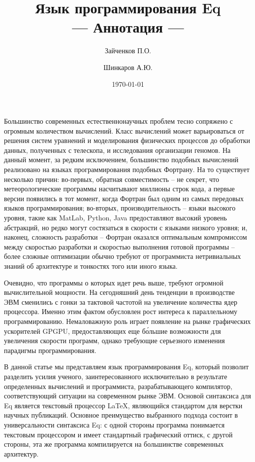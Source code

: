 \documentclass[a4paper]{llncs}
\author{Зайченков П.О.\inst{1} \and Шинкаров А.Ю.\inst{2}}
\date{\today}
\title{Язык программирования Eq \\
      --- Аннотация ---}
\institute{
  Московский физико-технический институт,
  Кафедра информатики и вычислительной техники
\and
  University of Hertfordshire,
  Hatfield, Hertfordshire,
  AL10 9AB, United Kingdom
}
\begin{document}
\maketitle

Большинство современных естественнонаучных проблем тесно сопряжено с
огромным количеством вычислений.  Класс вычислений может
варьироваться от решения систем уравнений и моделирования физических процессов 
до обработки данных, полученных с телескопа, и
исследования организации геномов.  На данный момент, за редким
исключением, большинство подобных вычислений реализовано на языках
программирования подобных Фортрану.  На то существует несколько
причин: во-первых, обратная совместимость -- не секрет, что
метеорологические программы насчитывают миллионы строк кода, а первые
версии появились в тот момент, когда Фортран был одним из самых
передовых языков программирования; во-вторых, производительность --
языки высокого уровня, такие как MatLab, Python, Java предоставляют
высокий уровень абстракций, но редко могут состязаться в скорости с
языками низкого уровня; и, наконец, сложность разработки -- Фортран
оказался оптимальным компромиссом между скоростью разработки и скоростью
выполнения готовой программы -- более сложные оптимизации обычно
требуют от программиста нетривиальных знаний об архитектуре и
тонкостях того или иного языка.

Очевидно, что программы о которых идет речь выше, требуют огромной
вычислительной мощности.  На сегодняшний день тенденции в
производстве ЭВМ сменились с гонки за тактовой частотой на
увеличение количества ядер процессора.  Именно этим фактом обусловлен рост
интереса к параллельному программированию.  Немаловажную роль
играет появление на рынке графических ускорителей GPGPU,
предоставляющих еще б\'{о}льшие возможности для увеличения скорости
программ, однако требующие серьезного изменения парадигмы
программирования.

В данной статье мы представляем язык программирования Eq, который
позволит разделить усилия ученого, заинтересованного исключительно в
результате определенных вычислений и программиста, разрабатывающего
компилятор, соответствующий ситуации на современном рынке ЭВМ.
Основой синтаксиса для Eq является текстовый процессор \LaTeX,
являющийся стандартом для верстки научных публикаций.  Основное
преимущество выбранного подхода состоит в универсальности синтаксиса
Eq: с одной стороны программа понимается текстовым процессором и имеет
стандартный графический оттиск, с другой стороны, эта же программа
компилируется на большинстве современных архитектур.
\end{document}
